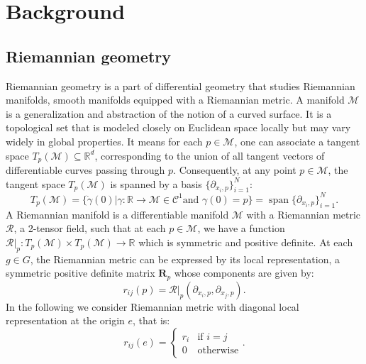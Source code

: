 \documentclass{article}
\DeclareMathOperator{\spn}{span}
\begin{document}
\section{Background} \label{app:background}

\subsection{Riemannian geometry} \label{app:riemannian_geometry}

Riemannian geometry is a part of differential geometry that studies Riemannian manifolds, smooth manifolds equipped with a Riemannian metric. A manifold $\mathcal{M}$ is a generalization and abstraction of the notion of a curved surface. It is a topological set that is modeled closely on Euclidean space locally but may vary widely in global properties. It means for each $p \in \mathcal{M}$, one can associate a tangent space $T_p(\mathcal{M}) \subseteq \mathbb{R}^d$, corresponding to the union of all tangent vectors of differentiable curves passing through $p$. Consequently, at any point $p \in \mathcal{M}$, the tangent space $T_p(\mathcal{M})$ is spanned by a basis $\{\partial_{x_i, p} \}_{i=1}^N$:
\begin{equation}
T_p(\mathcal{M}) = \{ \dot{\gamma}(0) | \gamma : \mathbb{R} \to \mathcal{M} \in \mathcal{C}^1 \text{and } \gamma(0) = p\} = \spn\{\partial_{x_i,p} \}_{i=1}^N.
\end{equation}
A Riemannian manifold is a differentiable manifold $\mathcal{M}$ with a Riemannian metric $\mathcal{R}$, a 2-tensor field, such that at each $p \in \mathcal{M}$, we have a function $\mathcal{R}|_p : T_p (\mathcal{M}) \times T_p(\mathcal{M}) \to \mathbb{R}$ which is symmetric and positive definite. At each $g \in G$, the Riemannian metric can be expressed by its local representation, a symmetric positive definite matrix $\boldsymbol{R}_p$ whose components are given by:
\begin{equation}
r_{ij}(p) = \mathcal{R}|_p (\partial_{x_i, p}, \partial_{x_j, p}).
\end{equation}
In the following we consider Riemannian metric with  diagonal local representation at the origin $e$, that is:
\begin{equation}
r_{ij}(e) = \left\{
    \begin{array}{ll}
        r_{i} & \text{if } i = j  \\
        0 & \text{otherwise}
    \end{array}
\right..
\end{equation}
\end{document}
